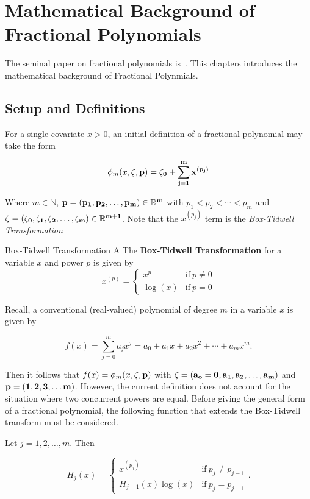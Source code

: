 \chapter{Mathematical Background of Fractional Polynomials}\label{fp}

The seminal paper on fractional polynomials is~\cite{royston}. This chapters introduces the mathematical background of Fractional Polynmials.

\section{Setup and Definitions}

For a single covariate $x > 0$, an initial definition of a fractional polynomial may take the form 

\[
    \phi_m(x, \bf{\zeta}, \bf{p}) = \zeta_0 + \sum_{j = 1}^{m} x^{(p_j)}    
\]

Where $m \in \mathbb{N}$, $\bf{p} = (p_1, p_2, \ldots, p_m) \in \mathbb{R}^m$ with $p_1 < p_2 < \cdots < p_m$ and $\bf{\zeta} = (\zeta_0, \zeta_1, \zeta_2, \ldots, \zeta_m) \in \mathbb{R}^{m+1}$. Note that the $x^{(p_j)}$ term is the \textit{Box-Tidwell Transformation}

\begin{definition}{Box-Tidwell Transformation}
    A The \textbf{Box-Tidwell Transformation} for a variable $x$ and power $p$ is given by 
    \[
        x^{(p)} = \begin{cases}
            x^{p} & \text{if} \ p \neq 0 \\
            \log(x) & \text{if} \ p = 0
        \end{cases}
    \]
    \label{def:bt}
\end{definition}

Recall, a conventional (real-valued) polynomial of degree $m$ in a variable $x$ is given by 

\[
    f(x) = \sum_{j = 0}^{m} a_j x^j = a_0 + a_1x + a_2x^2 + \cdots + a_mx^m.  
\]

Then it follows that $f(x) = \phi_m(x, \bf{\zeta}, \bf{p})$ with $\bf{\zeta} = (a_o = 0, a_1, a_2, \ldots, a_m)$ and $\bf{p} = (1, 2, 3, \ldots m)$. However, the current definition does not account for the situation where two concurrent powers are equal. Before giving the general form of a fractional polynomial, the following function that extends the Box-Tidwell transform must be considered.

Let $j = 1,2,\ldots,m$. Then

\[
      H_j(x) = \begin{cases}
        x^{(p_j)} & \text{if} \ p_j \neq p_{j-1} \\
        H_{j-1}(x)\log(x) & \text{if} \ p_j = p_{j-1}
      \end{cases}.
\]

